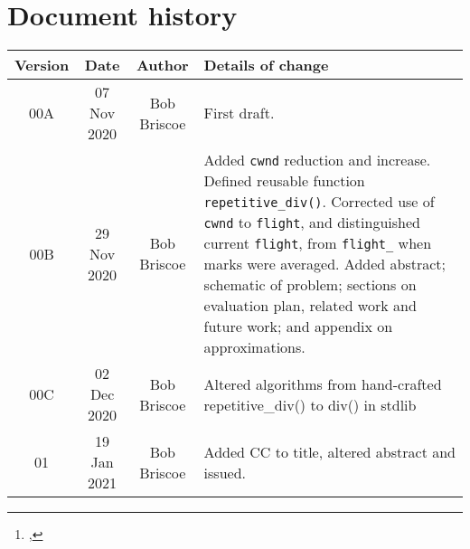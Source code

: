 \documentclass[a4paper,twoside,twocolumn]{article}
\title{\metatitle}%
\author{\metaauthori%
\thanks{\metamaili, %
\metaaddress}%
}
\date{\metadate}%
\newcommand*{\metaversion}{01}
\newcommand*{\metadate}{19 Jan 2021}
\begin{document}
%


\maketitle%
\thispagestyle{first}

\begin{abstract}
{\small\noindent%
}      %
\end{abstract}

\newpage
{}

{\footnotesize%
}

\appendix

\onecolumn%
\section*{Document history}

\begin{tabular}{|c|c|c|p{3.5in}|}
 \hline
Version &Date &Author &Details of change \\
 \hline\hline
00A          &07 Nov 2020&Bob Briscoe &First draft.\\\hline%
00B          &29 Nov 2020&Bob Briscoe &Added \texttt{cwnd} reduction and increase. Defined reusable function \texttt{repetitive\_div()}. Corrected use of \texttt{cwnd} to \texttt{flight}, and distinguished current \texttt{flight}, from \texttt{flight\_} when marks were averaged. Added abstract; schematic of problem; sections on evaluation plan, related work and future work; and appendix on approximations.\\\hline%
00C &02 Dec 2020  &Bob Briscoe &Altered algorithms from hand-crafted repetitive\_div() to div() in stdlib\\\hline%
\metaversion &\metadate  &Bob Briscoe &Added CC to title, altered abstract and issued.\\\hline%
\hline%
\end{tabular}
\end{document}
